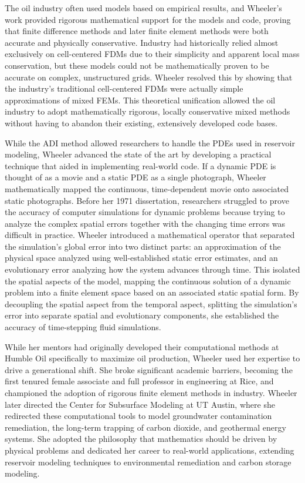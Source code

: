 The oil industry often used models based on empirical results, and Wheeler's work provided rigorous mathematical support for the models and code, proving that finite difference methods and later finite element methods were both accurate and physically conservative. Industry had historically relied almost exclusively on cell-centered FDMs due to their simplicity and apparent local mass conservation, but these models could not be mathematically proven to be accurate on complex, unstructured grids. Wheeler resolved this by showing that the industry's traditional cell-centered FDMs were actually simple approximations of mixed FEMs. This theoretical unification allowed the oil industry to adopt mathematically rigorous, locally conservative mixed methods without having to abandon their existing, extensively developed code bases. \cite{russellFiniteElementFinite1983} \cite{weiserConvergenceBlockCenteredFinite1988}

While the ADI method allowed researchers to handle the PDEs used in reservoir modeling, Wheeler advanced the state of the art by developing a practical technique that aided in implementing real-world code. If a dynamic PDE is thought of as a movie and a static PDE as a single photograph, Wheeler mathematically mapped the continuous, time-dependent movie onto associated static photographs. Before her 1971 dissertation, researchers struggled to prove the accuracy of computer simulations for dynamic problems because trying to analyze the complex spatial errors together with the changing time errors was difficult in practice. Wheeler introduced a mathematical operator that separated the simulation's global error into two distinct parts: an approximation of the physical space analyzed using well-established static error estimates, and an evolutionary error analyzing how the system advances through time. This isolated the spatial aspects of the model, mapping the continuous solution of a dynamic problem into a finite element space based on an associated static spatial form. By decoupling the spatial aspect from the temporal aspect, splitting the simulation's error into separate spatial and evolutionary components, she established the accuracy of time-stepping fluid simulations. 

While her mentors had originally developed their computational methods at Humble Oil specifically to maximize oil production, Wheeler used her expertise to drive a generational shift. She broke significant academic barriers, becoming the first tenured female associate and full professor in engineering at Rice, and championed the adoption of rigorous finite element methods in industry. Wheeler later directed the Center for Subsurface Modeling at UT Austin, where she redirected these computational tools to model groundwater contamination remediation, the long-term trapping of carbon dioxide, and geothermal energy systems. She adopted the philosophy that mathematics should be driven by physical problems and dedicated her career to real-world applications, extending reservoir modeling techniques to environmental remediation and carbon storage modeling. \cite{chiangModelingInsituBiorestoration1991}

